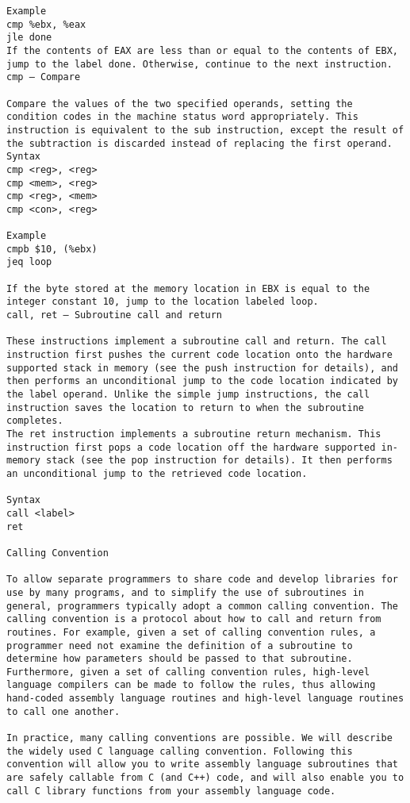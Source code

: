 \documentclass[10pt]{article}
\newlength{\sm}
\begin{document}
{\begin{multicols*}{5}
\begin{lstlisting}[breaklines=true,columns=fullflexible]
Example
cmp %ebx, %eax
jle done
If the contents of EAX are less than or equal to the contents of EBX, jump to the label done. Otherwise, continue to the next instruction.
cmp — Compare

Compare the values of the two specified operands, setting the condition codes in the machine status word appropriately. This instruction is equivalent to the sub instruction, except the result of the subtraction is discarded instead of replacing the first operand.
Syntax
cmp <reg>, <reg>
cmp <mem>, <reg>
cmp <reg>, <mem>
cmp <con>, <reg>

Example
cmpb $10, (%ebx)
jeq loop

If the byte stored at the memory location in EBX is equal to the integer constant 10, jump to the location labeled loop.
call, ret — Subroutine call and return

These instructions implement a subroutine call and return. The call instruction first pushes the current code location onto the hardware supported stack in memory (see the push instruction for details), and then performs an unconditional jump to the code location indicated by the label operand. Unlike the simple jump instructions, the call instruction saves the location to return to when the subroutine completes.
The ret instruction implements a subroutine return mechanism. This instruction first pops a code location off the hardware supported in-memory stack (see the pop instruction for details). It then performs an unconditional jump to the retrieved code location.

Syntax
call <label>
ret

Calling Convention

To allow separate programmers to share code and develop libraries for use by many programs, and to simplify the use of subroutines in general, programmers typically adopt a common calling convention. The calling convention is a protocol about how to call and return from routines. For example, given a set of calling convention rules, a programmer need not examine the definition of a subroutine to determine how parameters should be passed to that subroutine. Furthermore, given a set of calling convention rules, high-level language compilers can be made to follow the rules, thus allowing hand-coded assembly language routines and high-level language routines to call one another.

In practice, many calling conventions are possible. We will describe the widely used C language calling convention. Following this convention will allow you to write assembly language subroutines that are safely callable from C (and C++) code, and will also enable you to call C library functions from your assembly language code.


\end{lstlisting}
\end{multicols*}}
\end{document}
